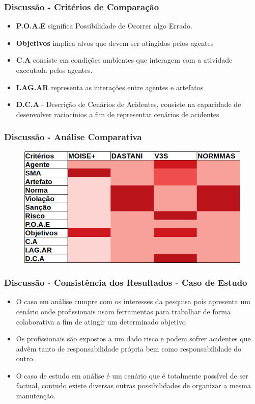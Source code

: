 \documentclass{beamer}
\begin{document}
\begin{frame}
	\frametitle{Discussão - Critérios de Comparação}
	\begin{itemize}
		\item \textbf{P.O.A.E} significa Possibilidade de Ocorrer algo Errado.
		\item \textbf{Objetivos} implica alvos que devem ser atingidos pelos agentes 
		\item \textbf{C.A} consiste em condições ambientes que interagem com a atividade executada pelos agentes.
		\item \textbf{I.AG.AR} representa as interações entre agentes e artefatos
		\item \textbf{D.C.A} - Descrição de Cenários de Acidentes, consiste na capacidade de desenvolver raciocínios a fim de representar cenários de acidentes.
	\end{itemize}
\end{frame}

\begin{frame}
	\frametitle{Discussão - Análise Comparativa}
	\begin{figure}[H]
		\centering
		\includegraphics[width=1\linewidth]{figure/table_head.png} 
		\label{classdiagrama}
	\end{figure}
\end{frame}

\begin{frame}
	\frametitle{Discussão - Consistência dos Resultados - Caso de Estudo}
	\begin{itemize}
		\item  O caso em análise cumpre com os interesses da pesquisa pois apresenta um cenário onde profissionais usam ferramentas para trabalhar de forma colaborativa a fim de atingir um determinado objetivo
		\item Os profissionais são expostos a um dado risco e podem sofrer acidentes que advêm tanto de responsabilidade própria bem como responsabilidade do outro.
		\item O caso de estudo em análise é um cenário que é totalmente possível de ser factual, contudo existe diversas outras possibilidades de organizar a mesma manutenção.
	\end{itemize}
\end{frame}
\end{document}
